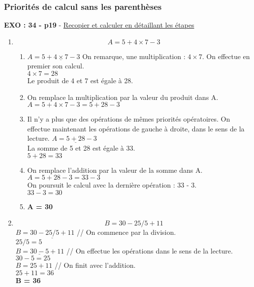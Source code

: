 \documentclass[11pt]{article}
\begin{document}
\subsubsection{Priorités de calcul sans les parenthèses}

\textbf{EXO : 34 - p19} - \underline{Recopier et calculer en détaillant les étapes}

\begin{enumerate}
\item $$A = 5 + 4 \times 7 - 3 $$
  \begin{enumerate}
  \item $A = 5 + \underline{4 \times 7} - 3 $
    On remarque, une multiplication : $4 \times 7$. On effectue en premier son calcul.\\
    $4 \times 7 = 28$\\
    Le produit de 4 et 7 est égale à 28.
  \item On remplace la multiplication par la valeur du produit dans A.\\
    $A = 5 + 4 \times 7 - 3 = 5 + 28 - 3$\\
  \item Il n'y a plus que des opérations de mêmes priorités opératoires. On effectue maintenant les opérations de gauche à droite, dans le sens de la lecture.
    $A = \underline{5 + 28} - 3$\\
    La somme de 5 et 28 est égale à 33.\\
    $5 + 28 = 33$\\
  \item On remplace l'addition par la valeur de la somme dans A.\\
    $A = 5 + 28 - 3 = 33 - 3$\\
    On poursuit le calcul avec la dernière opération : 33 - 3.\\
    $33 - 3 = 30$\\
  \item \textbf{A = 30}\\
  \end{enumerate}


\item $$B = 30 - 25 /5 + 11 $$
  $B = 30 -  \underline{25 /5} + 11 $ // On commence par la division.\\
  $25 / 5 = 5$\\
  $B = \underline{30 - 5} + 11$ // On effectue les opérations dans le sens de la lecture.\\
  $30 - 5 = 25$\\
  $B = 25 + 11$ // On finit avec l'addition.\\
  $25 + 11 = 36$\\
  \textbf{B = 36}\\
  

\end{enumerate}
\end{document}

